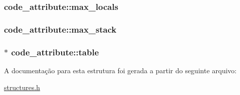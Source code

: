 \subsubsection[{\texorpdfstring{max\+\_\+locals}{max_locals}}]{ code\+\_\+attribute\+::max\+\_\+locals}\hypertarget{structcode__attribute_ab75487f3c1d38f9fb6ad5e71ab99dea2}{}\label{structcode__attribute_ab75487f3c1d38f9fb6ad5e71ab99dea2}
\subsubsection[{\texorpdfstring{max\+\_\+stack}{max_stack}}]{ code\+\_\+attribute\+::max\+\_\+stack}\hypertarget{structcode__attribute_abd4d398c165a4e91f3ea559808931473}{}\label{structcode__attribute_abd4d398c165a4e91f3ea559808931473}
\subsubsection[{\texorpdfstring{table}{table}}]{$\ast$ code\+\_\+attribute\+::table}\hypertarget{structcode__attribute_a8bdff0149755249696a5d6aa288d7a98}{}\label{structcode__attribute_a8bdff0149755249696a5d6aa288d7a98}


A documentação para esta estrutura foi gerada a partir do seguinte arquivo\+:\begin{DoxyCompactItemize}
\item 
\hyperlink{structures_8h}{structures.\+h}\end{DoxyCompactItemize}
